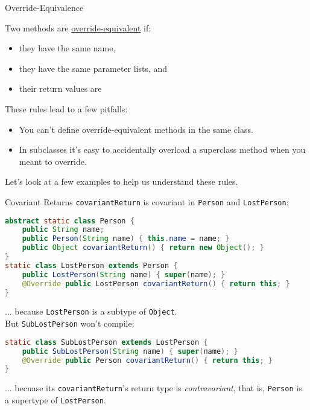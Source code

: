 \documentclass{beamer}
\begin{document}
\begin{frame}[fragile]{Override-Equivalence}

Two methods are \href{http://docs.oracle.com/javase/specs/jls/se8/html/jls-8.html#jls-8.4.2}{override-equivalent} if:
\begin{itemize}
\item they have the same name,
\item they have the same parameter lists, and
\item their return values are 
\end{itemize}

These rules lead to a few pitfalls:

\begin{itemize}
\item You can't define override-equivalent methods in the same class.
\item In subclasses it's easy to accidentally overload a superclass method when you meant to override.
\end{itemize}

Let's look at a few examples to help us understand these rules.

\end{frame}

\begin{frame}[fragile]{Covariant Returns}
\vspace{-.05in}
{\tt covariantReturn} is covariant in {\tt Person} and {\tt LostPerson}:
\vspace{-.05in}
\begin{lstlisting}[language=Java]
abstract static class Person {
    public String name;
    public Person(String name) { this.name = name; }
    public Object covariantReturn() { return new Object(); }
}
static class LostPerson extends Person {
    public LostPerson(String name) { super(name); }
    @Override public LostPerson covariantReturn() { return this; }
}
\end{lstlisting}
... because {\tt LostPerson} is a subtype of {\tt Object}.\\
But {\tt SubLostPerson} won't compile:
\vspace{-.05in}
\begin{lstlisting}[language=Java]
static class SubLostPerson extends LostPerson {
    public SubLostPerson(String name) { super(name); }
    @Override public Person covariantReturn() { return this; }
}
\end{lstlisting}
... becuase its {\tt covariantReturn}'s return type is {\it contravariant}, that is, {\tt Person} is a supertype of {\tt LostPerson}.
\end{frame}
\end{document}
